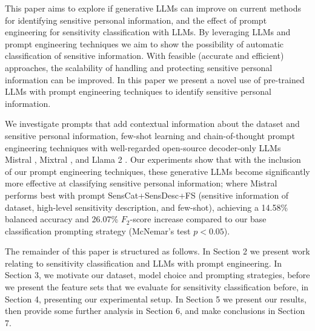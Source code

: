 This paper aims to explore if generative LLMs can improve on current methods for identifying sensitive personal information, and the effect of prompt engineering for sensitivity classification with LLMs. By leveraging LLMs and prompt engineering techniques we aim to show the possibility of automatic classification of sensitive information. With feasible (accurate and efficient) approaches, the scalability of handling and protecting sensitive personal information can be improved. In this paper we present a novel use of pre-trained LLMs with prompt engineering techniques to identify sensitive personal information.

We investigate prompts that add contextual information about the dataset and sensitive personal information, few-shot learning and chain-of-thought prompt engineering techniques with well-regarded open-source decoder-only LLMs Mistral \cite{jiang2023mistral}, Mixtral \cite{jiang2024mixtral}, and Llama 2 \cite{touvron2023llama}. Our experiments show that with the inclusion of our prompt engineering techniques, these generative LLMs become significantly more effective at classifying sensitive personal information; where Mistral performs best with prompt SensCat+SensDesc+FS (sensitive information of dataset, high-level sensitivity description, and few-shot), achieving a 14.58\% balanced accuracy and 26.07\% $F_2$-score increase compared to our base classification prompting strategy (McNemar's test $p<0.05$).

The remainder of this paper is structured as follows. In Section 2 we present work
relating to sensitivity classification and LLMs with prompt engineering. In Section 3, we motivate our dataset, model choice and prompting strategies, before we present the feature sets that we evaluate for sensitivity classification before, in Section 4, presenting our experimental setup. In Section 5 we present our results, then provide some further analysis in Section 6, and make conclusions in Section 7.
